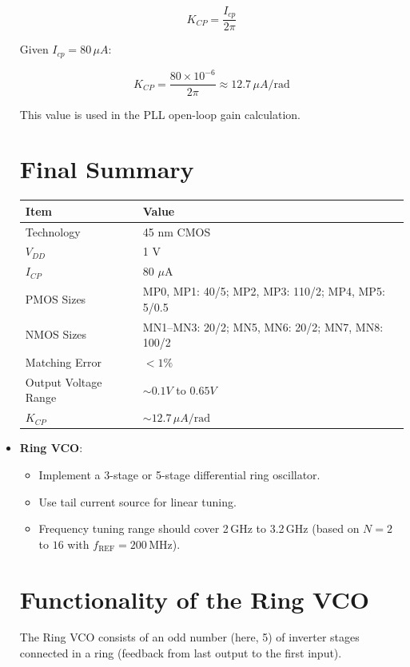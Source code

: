 \begin{itemize}
\[
K_{CP} = \frac{I_{cp}}{2\pi}
\]

Given $I_{cp} = 80\,\mu A$:

\[
K_{CP} = \frac{80 \times 10^{-6}}{2\pi} \approx 12.7\,\mu A/\text{rad}
\]

This value is used in the PLL open-loop gain calculation.

\section{Final Summary}

\begin{center}
\begin{tabular}{|l|l|}
\hline
\textbf{Item} & \textbf{Value} \\ \hline
Technology & 45 nm CMOS \\ \hline
$V_{DD}$ & 1 V \\ \hline
$I_{CP}$ & 80 $\mu$A \\ \hline
PMOS Sizes & MP0, MP1: 40/5; MP2, MP3: 110/2; MP4, MP5: 5/0.5 \\ \hline
NMOS Sizes & MN1--MN3: 20/2; MN5, MN6: 20/2; MN7, MN8: 100/2 \\ \hline
Matching Error & $<1\%$ \\ \hline
Output Voltage Range & $\sim 0.1V$ to $0.65V$ \\ \hline
$K_{CP}$ & $\sim 12.7\,\mu A/\text{rad}$ \\ \hline
\end{tabular}
\end{center}



    \item \textbf{Ring VCO}:
    \begin{itemize}
        \item Implement a 3-stage or 5-stage differential ring oscillator.
        \item Use tail current source for linear tuning.
        \item Frequency tuning range should cover 2\,GHz to 3.2\,GHz (based on $N = 2$ to $16$ with $f_{\text{REF}} = 200$\,MHz).
    \end{itemize}

\section{Functionality of the Ring VCO}

The Ring VCO consists of an odd number (here, 5) of inverter stages connected in a ring (feedback from last output to the first input).


\end{itemize}
